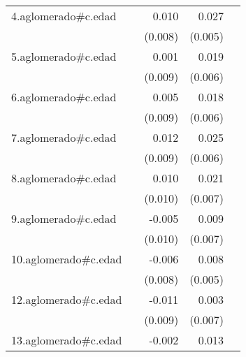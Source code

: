 {\begin{longtable}{l*{4}{D{.}{.}{-1}}}
\addlinespace
4.aglomerado#c.edad&                     &       0.010         &       0.027\sym{***}&                     \\
            &                     &     (0.008)         &     (0.005)         &                     \\
\addlinespace
5.aglomerado#c.edad&                     &       0.001         &       0.019\sym{***}&                     \\
            &                     &     (0.009)         &     (0.006)         &                     \\
\addlinespace
6.aglomerado#c.edad&                     &       0.005         &       0.018\sym{**} &                     \\
            &                     &     (0.009)         &     (0.006)         &                     \\
\addlinespace
7.aglomerado#c.edad&                     &       0.012         &       0.025\sym{***}&                     \\
            &                     &     (0.009)         &     (0.006)         &                     \\
\addlinespace
8.aglomerado#c.edad&                     &       0.010         &       0.021\sym{**} &                     \\
            &                     &     (0.010)         &     (0.007)         &                     \\
\addlinespace
9.aglomerado#c.edad&                     &      -0.005         &       0.009         &                     \\
            &                     &     (0.010)         &     (0.007)         &                     \\
\addlinespace
10.aglomerado#c.edad&                     &      -0.006         &       0.008         &                     \\
            &                     &     (0.008)         &     (0.005)         &                     \\
\addlinespace
12.aglomerado#c.edad&                     &      -0.011         &       0.003         &                     \\
            &                     &     (0.009)         &     (0.007)         &                     \\
\addlinespace
13.aglomerado#c.edad&                     &      -0.002         &       0.013\sym{**} &                     \\

\end{longtable}}

